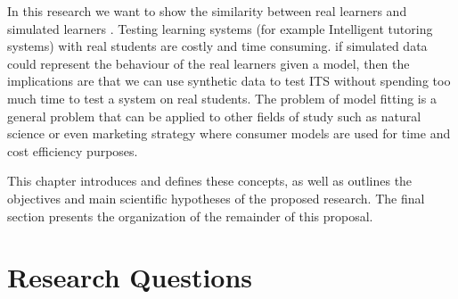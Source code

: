 In this research we want to show the similarity between real learners and simulated learners\DIFdelbegin %
\DIFdelend . Testing learning systems (for example Intelligent tutoring systems) with real students are costly and time consuming. if simulated data could represent the behaviour of the real learners given a model, then the implications are that we can use synthetic data to test ITS without spending too much time to test a system on real students. The problem of model fitting is a general problem that can be applied to other fields of study such as natural science or even marketing strategy where consumer models are used for time and cost efficiency purposes.



This chapter introduces and defines these concepts, as well as outlines the objectives and main scientific hypotheses of the proposed research. The final section presents the organization of the remainder of this proposal.


\section{Research Questions}
\paragraph{}\DIFdelbegin {}%

